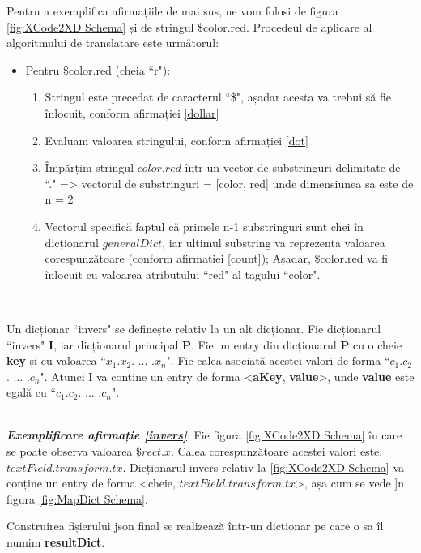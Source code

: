 Pentru a exemplifica afirmațiile de mai sus, ne vom folosi de figura \ref{fig:XCode2XD Schema} și de stringul \$color.red. Procedeul de aplicare al algoritmului de translatare este următorul:

\begin{itemize} \label{modalitate}
\item Pentru \$color.red (cheia ``r"): 
\begin{enumerate}
\item Stringul este precedat de caracterul ``\$", așadar acesta va trebui să fie înlocuit, conform afirmației \ref{dollar}
\item Evaluam valoarea stringului, conform afirmației \ref{dot}
\item Împărțim stringul $color.red$ într-un vector de substringuri delimitate de ``." => vectorul de substringuri = [color, red] unde dimensiunea sa este de n = 2
\item Vectorul specifică faptul că primele n-1 substringuri sunt chei în dicționarul $generalDict$, iar ultimul substring va reprezenta valoarea corespunzătoare (conform afirmației \ref{count}); Așadar, \$color.red va fi înlocuit cu valoarea atributului ``red" al tagului ``color".\\
\end{enumerate}
\end{itemize}

\\
\begin{mydef} \label{invers}
Un dicționar ``invers" se definește relativ la un alt dicționar. 
Fie dicționarul ``invers" \textbf{I}, iar dicționarul principal \textbf{P}. 
Fie un entry din dicționarul \textbf{P} cu o cheie \textbf{key} și cu valoarea ``$x_1$.$x_2$. ... .$x_n$".
Fie calea asociată acestei valori de forma ``$c_1$.$c_2$. ... .$c_n$".
Atunci I va conține un entry de forma <\textbf{aKey}, \textbf{value}>, unde \textbf{value} este egală cu ``$c_1$.$c_2$. ... .$c_n$".
\end{mydef}
\\
\textbf{\textit{Exemplificare afirmație \ref{invers}}}: Fie figura \ref{fig:XCode2XD Schema} în care se poate observa valoarea $\$rect.x$. Calea corespunzătoare acestei valori este: $textField.transform.tx$. Dicționarul invers relativ la \ref{fig:XCode2XD Schema} va conține un entry de forma <cheie, $textField.transform.tx$>, așa cum se vede ]n figura \ref{fig:MapDict Schema}. 
\\
\begin{myNote}
Construirea fișierului json final se realizează într-un dicționar pe care o sa îl numim \textbf{resultDict}.
\end{myNote}

